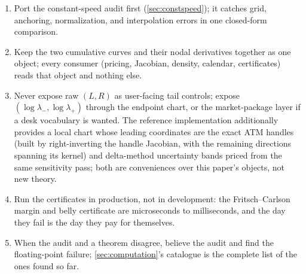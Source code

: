 \begin{enumerate}[leftmargin=1.6em]
\item Port the constant-speed audit first (\cref{sec:constspeed}); it
catches grid, anchoring, normalization, and interpolation errors in one
closed-form comparison.
\item Keep the two cumulative curves and their nodal derivatives
together as one object; every consumer (pricing, Jacobian, density,
calendar, certificates) reads that object and nothing else.
\item Never expose raw $(L,R)$ as user-facing tail controls; expose
$(\log\lambda_-,\log\lambda_+)$ through the endpoint chart, or the
market-package layer if a desk vocabulary is wanted.  The reference
implementation additionally provides a local chart whose leading
coordinates are the exact ATM handles (built by right-inverting the
handle Jacobian, with the remaining directions spanning its kernel) and
delta-method uncertainty bands priced from the same sensitivity pass;
both are conveniences over this paper's objects, not new theory.
\item Run the certificates in production, not in development: the
Fritsch--Carlson margin and belly certificate are microseconds to
milliseconds, and the day they fail is the day they pay for themselves.
\item When the audit and a theorem disagree, believe the audit and find
the floating-point failure; \cref{sec:computation}'s catalogue is the
complete list of the ones found so far.
\end{enumerate}
